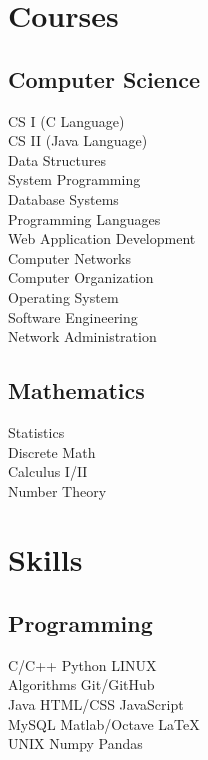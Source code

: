 \documentclass[]{deedy-resume-openfont}
\begin{document}
\begin{minipage}[t]{0.33\textwidth}

\section{Courses}
\subsection{Computer Science}
CS I (C Language) \\
CS II (Java Language) \\
Data Structures \\
System Programming \\
Database Systems \\
Programming Languages \\
Web Application Development \\
Computer Networks \\
Computer Organization \\
Operating System \\
Software Engineering \\
Network Administration \\ 
\sectionsep

\subsection{Mathematics}
Statistics \\
Discrete Math \\
Calculus I/II \\
Number Theory \\ 
\sectionsep


\section{Skills}
\subsection{Programming}
C/C++ \textbullet{} Python \textbullet{} LINUX \\
Algorithms \textbullet{} Git/GitHub \\
Java \textbullet{} HTML/CSS \textbullet{} JavaScript \\
MySQL \textbullet{} Matlab/Octave \textbullet{} \LaTeX \\ UNIX \textbullet{} Numpy \textbullet{} Pandas \\
\sectionsep


%
%

\end{minipage} 
\end{document}
